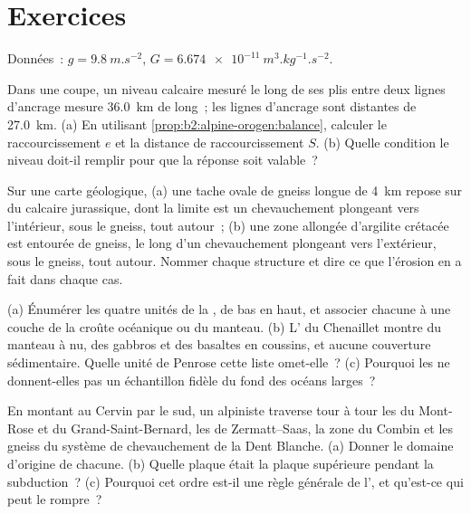\section*{Exercices}\label{sec:b2:alpine-orogen:exercises}

Données~: $g = \qty{9.8}{m.s^{-2}}$,
$G = \qty{6.674e-11}{m^3.kg^{-1}.s^{-2}}$.

\begin{exercise}[$\star$]\label{exo:b2:alpine-orogen:1}
Dans une coupe, un niveau calcaire mesuré le long de ses plis entre deux lignes d'ancrage mesure
\qty{36.0}{km} de long~; les lignes d'ancrage sont distantes de \qty{27.0}{km}. (a) En utilisant
\cref{prop:b2:alpine-orogen:balance}, calculer le raccourcissement $e$ et la distance de raccourcissement
$S$. (b) Quelle condition le niveau doit-il remplir pour que la réponse soit valable~?
\end{exercise}

\begin{exercise}[$\star$]\label{exo:b2:alpine-orogen:2}
Sur une carte géologique, (a) une tache ovale de gneiss longue de \qty{4}{km} repose sur du calcaire
jurassique, dont la limite est un chevauchement plongeant vers l'intérieur, sous le gneiss, tout autour~; (b) une
zone allongée d'argilite crétacée est entourée de gneiss, le long d'un chevauchement plongeant vers
l'extérieur, sous le gneiss, tout autour. Nommer chaque structure et dire ce que l'érosion en a fait
dans chaque cas.
\end{exercise}

\begin{exercise}[$\star$]\label{exo:b2:alpine-orogen:3}
(a) Énumérer les quatre unités de la , de bas en haut, et associer chacune
à une couche de la croûte océanique ou du manteau. (b) L' du Chenaillet montre du manteau à nu,
des gabbros et des basaltes en coussins, et aucune couverture sédimentaire. Quelle unité de Penrose cette liste
omet-elle~? (c) Pourquoi les  ne donnent-elles pas un échantillon fidèle du fond des
océans larges~?
\end{exercise}

\begin{exercise}[$\star$]\label{exo:b2:alpine-orogen:4}
En montant au Cervin par le sud, un alpiniste traverse tour à tour les  du Mont-Rose et du
Grand-Saint-Bernard, les  de Zermatt--Saas, la zone du Combin et les gneiss du système de
chevauchement de la Dent Blanche. (a) Donner le domaine d'origine de chacune. (b) Quelle plaque était la
plaque supérieure pendant la subduction~? (c) Pourquoi cet ordre est-il une règle générale de l',
et qu'est-ce qui peut le rompre~?
\end{exercise}

